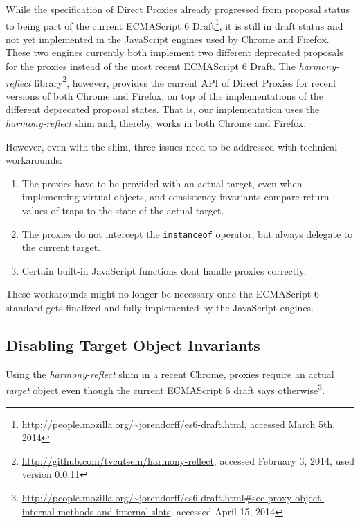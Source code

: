 While the specification of Direct Proxies already progressed from proposal status to being part of the current ECMAScript 6 Draft\footnote{\url{http://people.mozilla.org/~jorendorff/es6-draft.html}, accessed March 5th, 2014}, it is still in draft status and not yet implemented in the JavaScript engines used by Chrome and Firefox.
These two engines currently both implement two different deprecated proposals for the proxies instead of the most recent ECMAScript 6 Draft.
The \emph{harmony-reflect} library\footnote{\url{http://github.com/tvcutsem/harmony-reflect}, accessed February 3, 2014, used version 0.0.11}, however, provides the current API of Direct Proxies for recent versions of both Chrome and Firefox, on top of the implementations of the different deprecated proposal states.
That is, our implementation uses the \emph{harmony-reflect} shim and, thereby, works in both Chrome and Firefox.

However, even with the shim, three issues need to be addressed with technical workarounds:

\begin{enumerate}
    \item The proxies have to be provided with an actual target, even when implementing virtual objects, and consistency invariants compare return values of traps to the state of the actual target. 
    \item The proxies do not intercept the \lstinline{instanceof} operator, but always delegate to the current target.
    \item Certain built-in JavaScript functions dont handle proxies correctly.
\end{enumerate}

These workarounds might no longer be necessary once the ECMAScript 6 standard gets finalized and fully implemented by the JavaScript engines. 


\subsection{Disabling Target Object Invariants}


Using the \emph{harmony-reflect} shim in a recent Chrome, proxies require an actual \emph{target} object even though the current ECMAScript 6 draft says otherwise\footnote{\url{http://people.mozilla.org/~jorendorff/es6-draft.html\#sec-proxy-object-internal-methods-and-internal-slots}, accessed April 15, 2014}.


